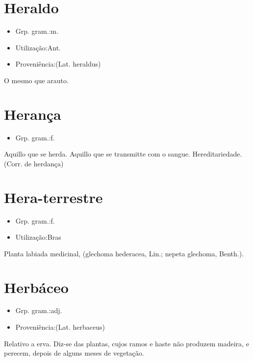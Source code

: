\documentclass{article}
\begin{document}
\section{Heraldo}
\begin{itemize}
\item {Grp. gram.:m.}
\end{itemize}
\begin{itemize}
\item {Utilização:Ant.}
\end{itemize}
\begin{itemize}
\item {Proveniência:(Lat. \textunderscore heraldus\textunderscore )}
\end{itemize}
O mesmo que \textunderscore arauto\textunderscore .
\section{Herança}
\begin{itemize}
\item {Grp. gram.:f.}
\end{itemize}
Aquillo que se herda.
Aquillo que se transmitte com o sangue.
Hereditariedade.
(Corr. de \textunderscore herdança\textunderscore )
\section{Hera-terrestre}
\begin{itemize}
\item {Grp. gram.:f.}
\end{itemize}
\begin{itemize}
\item {Utilização:Bras}
\end{itemize}
Planta labiada medicinal, (\textunderscore glechoma hederacea\textunderscore , Lin.; \textunderscore nepeta glechoma\textunderscore , Benth.).
\section{Herbáceo}
\begin{itemize}
\item {Grp. gram.:adj.}
\end{itemize}
\begin{itemize}
\item {Proveniência:(Lat. \textunderscore herbaceus\textunderscore )}
\end{itemize}
Relativo a erva.
Diz-se das plantas, cujos ramos e haste não produzem madeira, e perecem, depois de alguns meses de vegetação.
\end{document}
